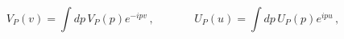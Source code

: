 \begin{equation*}
V_{P}\left( v\right) =\int dp\, V_{P}\left( p\right) e^{-ipv}\, ,\ \ \ \ \
\ \ \ \ \ \ \ \ \ \ \ U_{P}\left( u\right) =\int dp\, U_{P}\left( p\right)
e^{ipu}\, ,
\end{equation*}

